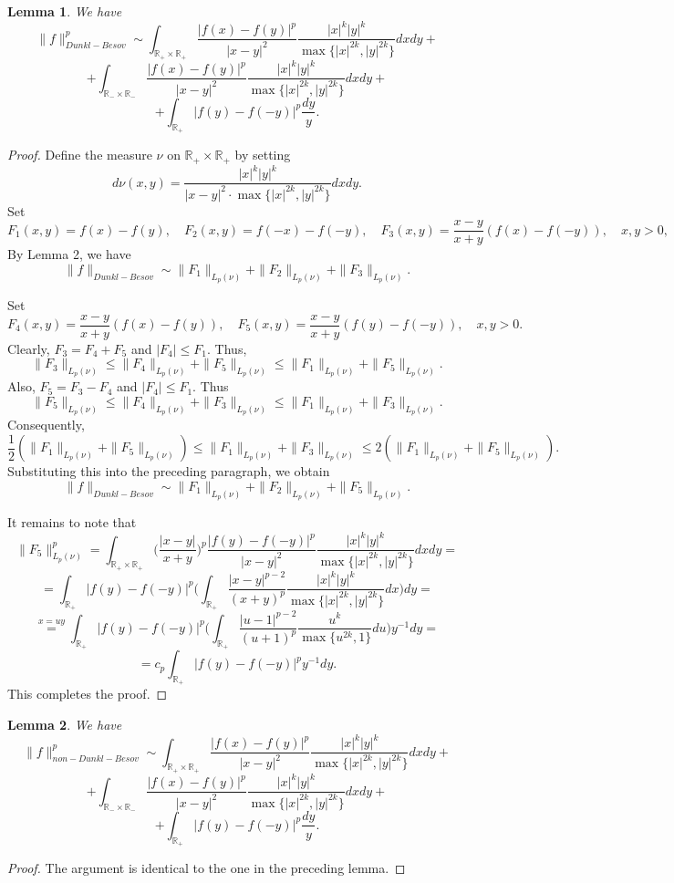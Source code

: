 \documentclass{amsart}
\newtheorem{lem}{Lemma}
\begin{document}
\begin{lem} We have
$$\|f\|_{Dunkl-Besov}^p\sim \int_{\mathbb{R}_+\times\mathbb{R}_+}\frac{|f(x)-f(y)|^p}{|x-y|^2}\frac{|x|^k|y|^k}{\max\{|x|^{2k},|y|^{2k}\}}dxdy+$$
$$+\int_{\mathbb{R}_-\times\mathbb{R}_-}\frac{|f(x)-f(y)|^p}{|x-y|^2}\frac{|x|^k|y|^k}{\max\{|x|^{2k},|y|^{2k}\}}dxdy+$$
$$+\int_{\mathbb{R}_+}|f(y)-f(-y)|^p\frac{dy}{y}.$$
\end{lem}
\begin{proof} Define the measure $\nu$ on $\mathbb{R}_+\times\mathbb{R}_+$ by setting
$$d\nu(x,y)=\frac{|x|^k|y|^k}{|x-y|^2\cdot\max\{|x|^{2k},|y|^{2k}\}}dxdy.$$
Set
$$F_1(x,y)=f(x)-f(y),\quad F_2(x,y)=f(-x)-f(-y),\quad F_3(x,y)=\frac{x-y}{x+y}(f(x)-f(-y)),\quad x,y>0,$$
By Lemma 2, we have 
$$\|f\|_{Dunkl-Besov}\sim \|F_1\|_{L_p(\nu)}+\|F_2\|_{L_p(\nu)}+\|F_3\|_{L_p(\nu)}.$$

Set
$$F_4(x,y)=\frac{x-y}{x+y}(f(x)-f(y)),\quad F_5(x,y)=\frac{x-y}{x+y}(f(y)-f(-y)),\quad x,y>0.$$
Clearly, $F_3=F_4+F_5$ and $|F_4|\leq F_1.$ Thus,
$$\|F_3\|_{L_p(\nu)}\leq\|F_4\|_{L_p(\nu)}+\|F_5\|_{L_p(\nu)}\leq\|F_1\|_{L_p(\nu)}+\|F_5\|_{L_p(\nu)}.$$
Also, $F_5=F_3-F_4$ and $|F_4|\leq F_1.$ Thus
$$\|F_5\|_{L_p(\nu)}\leq\|F_4\|_{L_p(\nu)}+\|F_3\|_{L_p(\nu)}\leq\|F_1\|_{L_p(\nu)}+\|F_3\|_{L_p(\nu)}.$$
Consequently,
$$\frac12(\|F_1\|_{L_p(\nu)}+\|F_5\|_{L_p(\nu)})\leq\|F_1\|_{L_p(\nu)}+\|F_3\|_{L_p(\nu)}\leq 2(\|F_1\|_{L_p(\nu)}+\|F_5\|_{L_p(\nu)}).$$
Substituting this into the preceding paragraph, we obtain
$$\|f\|_{Dunkl-Besov}\sim \|F_1\|_{L_p(\nu)}+\|F_2\|_{L_p(\nu)}+\|F_5\|_{L_p(\nu)}.$$

It remains to note that
$$\|F_5\|_{L_p(\nu)}^p=\int_{\mathbb{R}_+\times\mathbb{R}_+}\Big(\frac{|x-y|}{x+y}\Big)^p\frac{|f(y)-f(-y)|^p}{|x-y|^2}\frac{|x|^k|y|^k}{\max\{|x|^{2k},|y|^{2k}\}}dxdy=$$
$$=\int_{\mathbb{R}_+}|f(y)-f(-y)|^p\Big(\int_{\mathbb{R}_+}\frac{|x-y|^{p-2}}{(x+y)^p}\frac{|x|^k|y|^k}{\max\{|x|^{2k},|y|^{2k}\}}dx\Big)dy=$$
$$\stackrel{x=uy}{=}\int_{\mathbb{R}_+}|f(y)-f(-y)|^p\Big(\int_{\mathbb{R}_+}\frac{|u-1|^{p-2}}{(u+1)^p}\frac{u^k}{\max\{u^{2k},1\}}du\Big)y^{-1}dy=$$
$$=c_p\int_{\mathbb{R}_+}|f(y)-f(-y)|^py^{-1}dy.$$
This completes the proof.
\end{proof}

\begin{lem} We have
$$\|f\|_{non-Dunkl-Besov}^p\sim \int_{\mathbb{R}_+\times\mathbb{R}_+}\frac{|f(x)-f(y)|^p}{|x-y|^2}\frac{|x|^k|y|^k}{\max\{|x|^{2k},|y|^{2k}\}}dxdy+$$
$$+\int_{\mathbb{R}_-\times\mathbb{R}_-}\frac{|f(x)-f(y)|^p}{|x-y|^2}\frac{|x|^k|y|^k}{\max\{|x|^{2k},|y|^{2k}\}}dxdy+$$
$$+\int_{\mathbb{R}_+}|f(y)-f(-y)|^p\frac{dy}{y}.$$
\end{lem}
\begin{proof} The argument is identical to the  one in the preceding lemma.
\end{proof}
\end{document}
